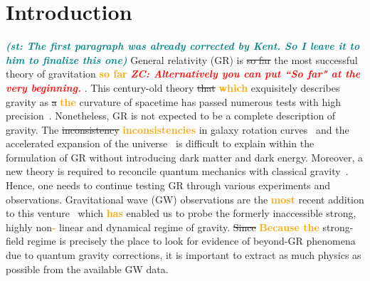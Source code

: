 \documentclass[prd,twocolumn,nofootinbib]{revtex4-1}
\newcommand{\shammi}[1]{\textcolor{teal}{\it{\textbf{(st: #1)}}} }
\newcommand{\zc}[1]{\textcolor{red}{\it{\textbf{ZC: #1}}} }
\newcommand{\zack}[1]{\textcolor{orange}{\textbf{#1}} }
\begin{document}
\date{\today}




\maketitle




\section{Introduction}
\shammi{The first paragraph was already corrected by Kent. So I leave it to him to finalize this one}
General relativity (GR) is \sout{so far} the most successful theory of gravitation \zack{so far}\zc{Alternatively you can put ``So far" at the very beginning.}. This century-old theory \sout{that} \zack{which} exquisitely describes gravity as \sout{a} \zack{the} curvature of spacetime has passed numerous tests with high precision~\cite{Will:2014kxa}. Nonetheless, GR is not expected to be a complete description of gravity. The \sout{inconsistency} \zack{inconsistencies} in  galaxy rotation curves~\cite{article,Bosma:1981zz,Begeman:1991iy,Rubin:1970zza,Rubin:1980zd,1973ApJ...186..467O,Ostriker:1993fr} and the accelerated expansion of the universe~\cite{Abbott:1988nx,Copeland:2006wr,Perlmutter:1998np,Riess:1998cb,Riess:2004nr,RevModPhys.61.1,vanAlbada:1984js,WEINBERG201387}  is difficult to explain within the formulation of GR without introducing dark matter and dark energy. Moreover, a new theory is required to reconcile quantum mechanics with classical gravity~\cite{Adler:2010wf,Ng:2003jk}. Hence, one needs to continue testing GR through various experiments and observations. Gravitational wave (GW) observations are the \zack{most} recent addition to this venture~\cite{TheLIGOScientific:2016src,Yunes:2016jcc,LIGOScientific:2019fpa,Monitor:2017mdv,Abbott:2018lct} which \zack{has} enabled us to probe the formerly inaccessible strong, highly non\zack{-}linear and dynamical regime of gravity. \sout{Since} \zack{Because the} strong-field regime is precisely the place to look for evidence of beyond-GR phenomena due to quantum gravity corrections, it is important to extract as much physics as possible from the available GW data. 
\end{document}

